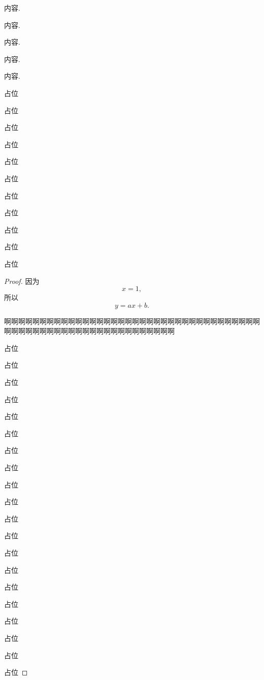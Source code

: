 \documentclass[zihao=-4, fontset=windows]{MyBeautybook-CN}
\begin{document}
    \begin{solution}
        内容.
    \end{solution}

    \begin{proposition}
        内容.
    \end{proposition}

    \begin{theorem}[][名称]
        内容.
    \end{theorem}

    \begin{example}
        内容.
    \end{example}

    \begin{corollary}
        内容.

        占位

        占位

        占位

        占位

        占位

        占位

        占位

        占位

        占位

        占位

        占位
    \end{corollary}

    \begin{proof}
        因为
        $$
        x=1,
        $$
        所以
        $$
        y=ax+b.
        $$

        啊啊啊啊啊啊啊啊啊啊啊啊啊啊啊啊啊啊啊啊啊啊啊啊啊啊啊啊啊啊啊啊啊啊啊啊啊啊啊啊啊啊啊啊啊啊啊啊啊啊啊啊啊啊啊啊啊啊啊啊

        占位

        占位

        占位

        占位

        占位

        占位

        占位

        占位

        占位

        占位

        占位

        占位

        占位

        占位

        占位

        占位

        占位

        占位

        占位

        占位
    \end{proof}
\end{document}
